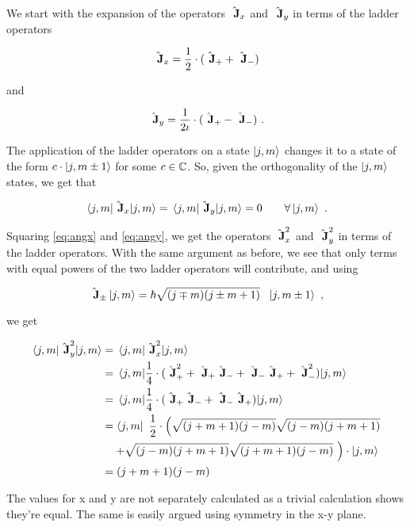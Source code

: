 

We start with the expansion of the operators $\hat{\textbf{~J}}_x$ and 
$\hat{\textbf{~J}}_y$ in terms of the ladder operators

\begin{equation}
    \hat{\textbf{~J}}_x = \frac{1}{2} \cdot (\hat{\textbf{~J}}_+ + \hat{\textbf{~J}}_-)
    \label{eq:angx}
\end{equation}

and

\begin{equation}
    \hat{\textbf{~J}}_y = \frac{1}{2\iota} \cdot (\hat{\textbf{~J}}_+ - \hat{\textbf{~J}}_-)~.
    \label{eq:angy}
\end{equation}

The application of the ladder operators on a state $\ket{j, m}$ changes it to a 
state of the form $c\cdot \ket{j, m \pm 1}$ for some $c \in \mathbb{C}$. So, given 
the orthogonality of the $\ket{j, m}$ states, we get that

\begin{equation}
    \expectationvalue{\Angularmomentum_x}{j, m} = \expectationvalue{\Angularmomentum_y}{j, m}  = 0 \qquad\forall \ket{j, m}~.
\end{equation}

Squaring \autoref{eq:angx} and \ref{eq:angy}, we get the operators $\hat{\textbf{~J}}_x ^2$
and $\hat{\textbf{~J}}_y ^2$ in terms of the ladder operators. With the same argument as before,
we see that only terms with equal powers of the two ladder operators will contribute, and using

\begin{equation}
    \hat{\textbf{~J}}_{\pm}\ket{j, m} = \hbar \sqrt{(j \mp m)(j \pm m + 1)} ~~\ket{j, m \pm 1} ~, 
\end{equation}

we get 


\begin{align}
    \expectationvalue{\Angularmomentum_y ^2}{j, m} &= \expectationvalue{\Angularmomentum_x ^2}{j, m} \\
    &= \expectationvalue{\frac{1}{4} \cdot (\Angularmomentum_+ ^2 + \Angularmomentum_+ \Angularmomentum_-
            + \Angularmomentum_- \Angularmomentum_+ + \Angularmomentum_- ^2)}{j, m} \\
    &= \expectationvalue{\frac{1}{4} \cdot (\Angularmomentum_+ \Angularmomentum_-
            + \Angularmomentum_- \Angularmomentum_+)}{j, m} \\
    &= \bra{j, m}~\frac{1}{2} \cdot \left(\sqrt{(j + m + 1)(j - m)}\sqrt{(j - m)(j + m + 1)} \right.\nonumber \\
        &\quad\left. + \sqrt{(j - m)(j + m + 1)}\sqrt{(j + m + 1)(j - m)}~\right) \cdot \ket{j, m} \\
    &= (j + m + 1)(j - m)
\end{align}

The values for x and y are not separately calculated as a trivial calculation shows they're equal. The 
same is easily argued using symmetry in the x-y plane.